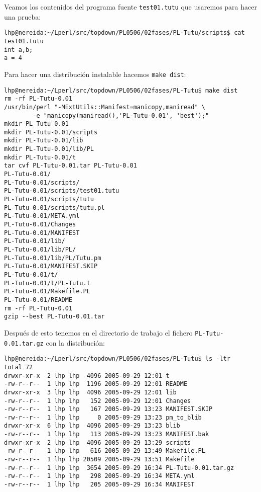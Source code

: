 Veamos los contenidos del programa fuente \verb|test01.tutu|
que usaremos para hacer una prueba:
\begin{verbatim}
lhp@nereida:~/Lperl/src/topdown/PL0506/02fases/PL-Tutu/scripts$ cat test01.tutu
int a,b;
a = 4
\end{verbatim}


Para hacer una distribución instalable hacemos \verb|make dist|:
\begin{verbatim}
lhp@nereida:~/Lperl/src/topdown/PL0506/02fases/PL-Tutu$ make dist
rm -rf PL-Tutu-0.01
/usr/bin/perl "-MExtUtils::Manifest=manicopy,maniread" \
        -e "manicopy(maniread(),'PL-Tutu-0.01', 'best');"
mkdir PL-Tutu-0.01
mkdir PL-Tutu-0.01/scripts
mkdir PL-Tutu-0.01/lib
mkdir PL-Tutu-0.01/lib/PL
mkdir PL-Tutu-0.01/t
tar cvf PL-Tutu-0.01.tar PL-Tutu-0.01
PL-Tutu-0.01/
PL-Tutu-0.01/scripts/
PL-Tutu-0.01/scripts/test01.tutu
PL-Tutu-0.01/scripts/tutu
PL-Tutu-0.01/scripts/tutu.pl
PL-Tutu-0.01/META.yml
PL-Tutu-0.01/Changes
PL-Tutu-0.01/MANIFEST
PL-Tutu-0.01/lib/
PL-Tutu-0.01/lib/PL/
PL-Tutu-0.01/lib/PL/Tutu.pm
PL-Tutu-0.01/MANIFEST.SKIP
PL-Tutu-0.01/t/
PL-Tutu-0.01/t/PL-Tutu.t
PL-Tutu-0.01/Makefile.PL
PL-Tutu-0.01/README
rm -rf PL-Tutu-0.01
gzip --best PL-Tutu-0.01.tar
\end{verbatim}
Después de esto tenemos en el directorio de trabajo
el fichero  \verb|PL-Tutu-0.01.tar.gz| con la distribución:
\begin{verbatim}
lhp@nereida:~/Lperl/src/topdown/PL0506/02fases/PL-Tutu$ ls -ltr
total 72
drwxr-xr-x  2 lhp lhp  4096 2005-09-29 12:01 t
-rw-r--r--  1 lhp lhp  1196 2005-09-29 12:01 README
drwxr-xr-x  3 lhp lhp  4096 2005-09-29 12:01 lib
-rw-r--r--  1 lhp lhp   152 2005-09-29 12:01 Changes
-rw-r--r--  1 lhp lhp   167 2005-09-29 13:23 MANIFEST.SKIP
-rw-r--r--  1 lhp lhp     0 2005-09-29 13:23 pm_to_blib
drwxr-xr-x  6 lhp lhp  4096 2005-09-29 13:23 blib
-rw-r--r--  1 lhp lhp   113 2005-09-29 13:23 MANIFEST.bak
drwxr-xr-x  2 lhp lhp  4096 2005-09-29 13:29 scripts
-rw-r--r--  1 lhp lhp   616 2005-09-29 13:49 Makefile.PL
-rw-r--r--  1 lhp lhp 20509 2005-09-29 13:51 Makefile
-rw-r--r--  1 lhp lhp  3654 2005-09-29 16:34 PL-Tutu-0.01.tar.gz
-rw-r--r--  1 lhp lhp   298 2005-09-29 16:34 META.yml
-rw-r--r--  1 lhp lhp   205 2005-09-29 16:34 MANIFEST
\end{verbatim}

